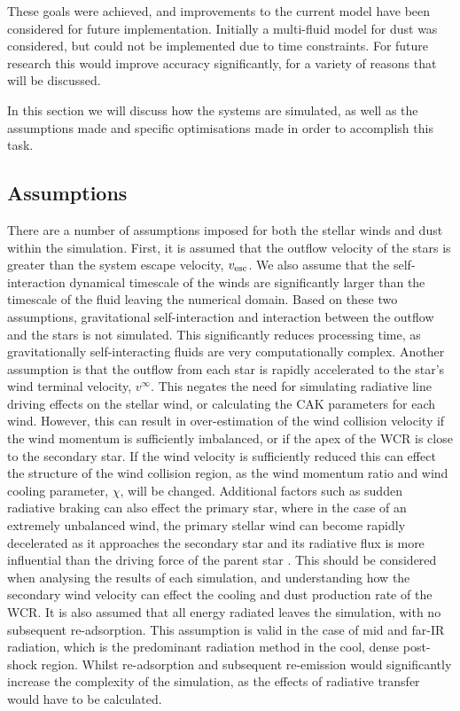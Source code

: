 \noindent
These goals were achieved, and improvements to the current model have been considered for future implementation.
Initially a multi-fluid model for dust was considered, but could not be implemented due to time constraints.
For future research this would improve accuracy significantly, for a variety of reasons that will be discussed.

In this section we will discuss how the systems are simulated, as well as the assumptions made and specific optimisations made in order to accomplish this task.

\subsection{Assumptions}
\label{sec:simassumptions}

There are a number of assumptions imposed for both the stellar winds and dust within the simulation.
First, it is assumed that the outflow velocity of the stars is greater than the system escape velocity, $v_\text{esc}$.
We also assume that the self-interaction dynamical timescale of the winds are significantly larger than the timescale of the fluid leaving the numerical domain.
Based on these two assumptions, gravitational self-interaction and interaction between the outflow and the stars is not simulated.
This significantly reduces processing time, as gravitationally self-interacting fluids are very computationally complex.
Another assumption is that the outflow from each star is rapidly accelerated to the star's wind terminal velocity, $v^\infty$.
This negates the need for simulating radiative line driving effects on the stellar wind, or calculating the CAK parameters for each wind.
However, this can result in over-estimation of the wind collision velocity if the wind momentum is sufficiently imbalanced, or if the apex of the WCR is close to the secondary star.
If the wind velocity is sufficiently reduced this can effect the structure of the wind collision region, as the wind momentum ratio and wind cooling parameter, $\chi$, will be changed.
Additional factors such as sudden radiative braking can also effect the primary star, where in the case of an extremely unbalanced wind, the primary stellar wind can become rapidly decelerated as it approaches the secondary star and its radiative flux is more influential than the driving force of the parent star \parencite{gayley_sudden_1997}.
This should be considered when analysing the results of each simulation, and understanding how the secondary wind velocity can effect the cooling and dust production rate of the WCR.
It is also assumed that all energy radiated leaves the simulation, with no subsequent re-adsorption.
This assumption is valid in the case of mid and far-IR radiation, which is the predominant radiation method in the cool, dense post-shock region.
Whilst re-adsorption and subsequent re-emission would significantly increase the complexity of the simulation, as the effects of radiative transfer would have to be calculated.

